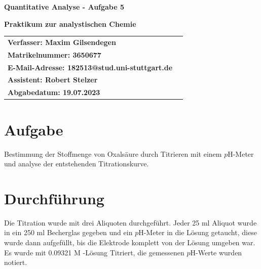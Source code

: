 \documentclass[12pt]{scrartcl} %
\begin{document}
\begin{titlepage}
\begin{center}
\vspace*{2cm}
\begin{LARGE}
\vspace*{1cm}
\textbf{\textsf{Quantitative Analyse - Aufgabe 5\\}}
\end{LARGE}
\vspace*{1cm}
\textbf{\textsf{Praktikum zur analystischen Chemie}}\\
\vspace*{1.5cm}
\begin{table}[H]
\sffamily
\hspace*{3cm}\begin{tabular}{>{\bfseries}l>{\bfseries}l}
Verfasser: Maxim Gilsendegen\\
Matrikelnummer: 3650677\\
E-Mail-Adresse: 182513@stud.uni-stuttgart.de\\
Assistent: Robert Stelzer\\
Abgabedatum: 19.07.2023\\
\end{tabular}
\end{table}
\end{center}
\end{titlepage}
\renewcommand{\thepage}{\Roman{page}}\setcounter{page}{1}
\tableofcontents %
\newpage
\renewcommand{\thepage}{\arabic{page}}\setcounter{page}{1}

\section{Aufgabe}
Bestimmung der Stoffmenge von Oxalsäure durch Titrieren mit einem $p$H-Meter und analyse der entstehenden Titrationskurve.\\

\section{Durchführung}
Die Titration wurde mit drei Aliquoten durchgeführt. Jeder 25 ml Aliquot wurde in ein 250 ml Becherglas gegeben und ein $p$H-Meter in die Lösung getaucht, diese wurde dann aufgefüllt, bis die Elektrode komplett von der Lösung umgeben war.\\
Es wurde mit 0.09321 M -Lösung Titriert, die gemessenen $p$H-Werte wurden notiert.
\end{document}

